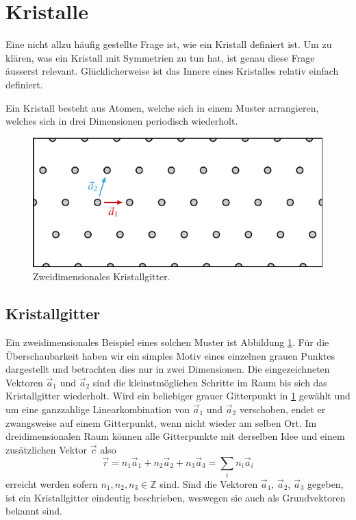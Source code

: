 \section{Kristalle}
Eine nicht allzu häufig gestellte Frage ist, wie ein Kristall definiert ist.
Um zu klären, was ein Kristall mit Symmetrien zu tun hat, ist genau diese Frage äusserst relevant. 
Glücklicherweise ist das Innere eines Kristalles relativ einfach definiert.
\begin{definition}[Kristall]
    Ein Kristall besteht aus Atomen, welche sich in einem Muster arrangieren, welches sich in drei Dimensionen periodisch wiederholt.
\end{definition}

\begin{figure}
    \centering
    \includegraphics[]{papers/punktgruppen/figures/lattice}
    \caption{
        Zweidimensionales Kristallgitter.
        \label{fig:punktgruppen:lattice}
    }
\end{figure}
\subsection{Kristallgitter}
Ein zweidimensionales Beispiel eines solchen Muster ist Abbildung \ref{fig:punktgruppen:lattice}.
Für die Überschaubarkeit haben wir ein simples Motiv eines einzelnen grauen Punktes dargestellt und betrachten dies nur in zwei Dimensionen.
Die eingezeichneten Vektoren \(\vec{a}_1\) und \(\vec{a}_2\) sind die kleinstmöglichen Schritte im Raum bis sich das Kristallgitter wiederholt.
Wird ein beliebiger grauer Gitterpunkt in \ref{fig:punktgruppen:lattice} gewählt und um eine ganzzahlige Linearkombination von \(\vec{a}_1\) und \(\vec{a}_2\) verschoben, endet er zwangsweise auf einem Gitterpunkt, wenn nicht wieder am selben Ort.
Im dreidimensionalen Raum können alle Gitterpunkte mit derselben Idee und einem zusätzlichen Vektor \(\vec{c}\) also
\[
	\vec{r} = n_1 \vec{a}_1 + n_2 \vec{a}_2 + n_3 \vec{a}_3 = \sum_i n_i \vec{a}_i
\]
erreicht werden sofern \(n_1,n_2,n_3 \in \mathbb{Z}\) sind.
Sind die Vektoren  \(\vec{a}_1\), \(\vec{a}_2\), \(\vec{a}_3\) gegeben, ist ein Kristallgitter eindeutig beschrieben, weswegen sie auch als Grundvektoren bekannt sind.

